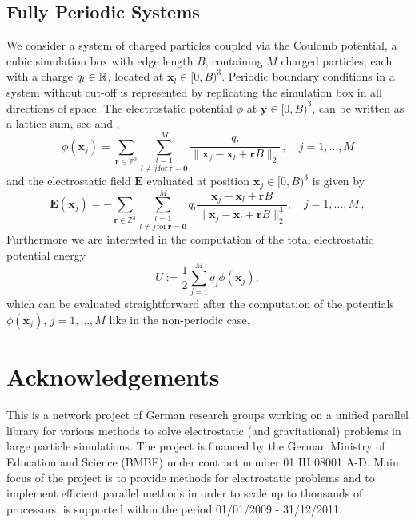 \subsection{Fully Periodic Systems}
We consider a system of charged particles coupled via the Coulomb potential, a cubic simulation box with
edge length $B$, containing $M$ charged particles, each with a charge $q_l\in\mathbb{R}$, located at $\mathbf x_l\in [0,B)^3$.
Periodic boundary conditions in a system without cut-off is represented by replicating the simulation
box in all directions of space.
The electrostatic potential $\phi$ at $\mathbf y\in [0,B)^3$, can be written as a lattice sum,
see \cite[Chapter 12]{FrSm02} and \cite{Sut06},
\begin{equation}\label{eq:potential_3dp}
  \phi(\mathbf x_j)
  = \sum_{\mathbf r\in \mathbb Z^3} \underset{ l\neq j \,\text{for}\, \mathbf r= \mathbf 0}{\sum_{l=1}^M}
    \frac{q_l}{\|\mathbf x_j -\mathbf x_l +\mathbf r B\|_2}\,,
    \quad j=1,\hdots,M
\end{equation}
and the electrostatic field $\mathbf E$ evaluated at position $\mathbf x_j\in [0,B)^3$ is given by
\begin{equation}\label{eq:fields_3dp}
  \mathbf E(\mathbf x_j)
  = - \sum_{\mathbf r\in \mathbb Z^3}
    \underset{ l\neq j \,\text{for}\, \mathbf r= \mathbf 0}{\sum_{l=1}^M}
    q_l \frac{\mathbf x_j -\mathbf x_l +\mathbf r B}{\|\mathbf x_j -\mathbf x_l +\mathbf r B \|_2^3},
    \quad j=1,\hdots,M\, ,
\end{equation}
Furthermore we are interested in the computation of the total electrostatic potential energy
\begin{equation*}
  U := \frac{1}{2} \sum\limits_{j = 1}^{M} q_j \phi(\mathbf x_j),
\end{equation*}
which can be evaluated straightforward after the computation
of the potentials $\phi(\mathbf x_j)$, $j=1,\hdots,M$ like in the non-periodic case.




\section{Acknowledgements}

This is a network project of German research groups working on a
unified parallel library for various methods to solve electrostatic
(and gravitational) problems in large particle simulations. The
project is financed by the German Ministry of Education and Science
(BMBF) under contract number 01 IH 08001 A-D.  Main focus of the
project is to provide methods for electrostatic problems and to
implement efficient parallel methods in order to scale up to thousands
of processors.  \fcs is supported within the period 01/01/2009 -
31/12/2011.


